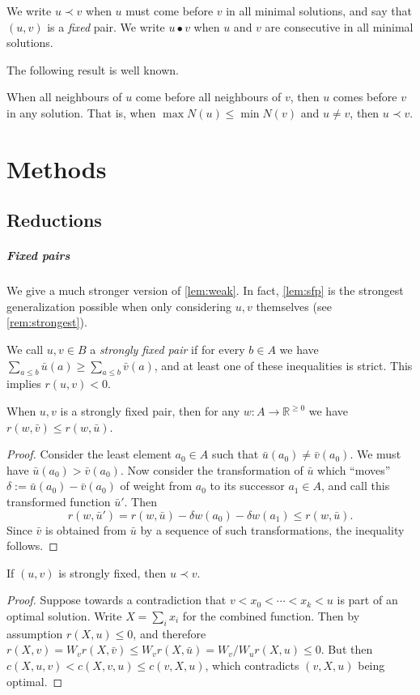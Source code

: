\documentclass[a4paper,UKenglish,cleveref, autoref, thm-restate]{lipics-v2021}
\renewcommand{\b}{\prec}
\newcommand{\g}{\bullet}
\begin{document}
We write $u\b v$ when $u$ must come before $v$ in all minimal solutions, and say that $(u, v)$
is a \emph{fixed} pair.
We write $u\g v$ when $u$ and $v$ are consecutive in all minimal solutions.

The following result is well known.

\begin{observation}\label{lem:weak}
  When all neighbours of $u$ come before all neighbours of $v$, then $u$ comes
  before $v$ in any solution.
  That is, when $\max N(u) \leq \min N(v)$ and $u\neq v$, then $u\b v$.
\end{observation}

\section{Methods}
\subsection{Reductions}
\subparagraph{Fixed pairs}
We give a much stronger version of \cref{lem:weak}. In fact, \cref{lem:sfp} is the strongest
generalization possible when only considering $u, v$ themselves (see \cref{rem:strongest}).
\begin{definition}
    We call $u, v \in B$ a \emph{strongly fixed pair} if for every $b \in A$ we have ${\sum_{a
    \leq b} \bar u(a) \geq \sum_{a \leq b} \bar v(a)}$, and at least one of these inequalities
    is strict. This implies $r(u, v) {<} 0$.
\end{definition}
\begin{lemma}\label{lem:sfp} When $u, v$ is a strongly fixed pair,
    then for any $w: A\to \mathbb R^{\geq 0}$ we have $r(w, \bar v) \leq r(w, \bar u)$.
\end{lemma}
\begin{proof}
    Consider the least element $a_0 \in A$ such that $\bar u(a_0) \neq
    \bar v(a_0)$. We must have $\bar u(a_0) > \bar v(a_0)$. Now consider the transformation of
    $\bar u$ which ``moves'' $\delta := \bar u(a_0) - \bar v(a_0)$ of weight from $a_0$ to its
    successor $a_1 \in A$, and call this transformed function $\bar u'$. Then
    \[
        r(w, \bar u') = r(w, \bar u) - \delta w(a_0) - \delta w(a_1) \leq r(w, \bar u).
    \]
    Since $\bar v$ is obtained from $\bar u$ by a sequence of such transformations,
    the inequality follows.
\end{proof}
\begin{lemma}
    If $(u, v)$ is strongly fixed, then $u \b v$.
\end{lemma}
\begin{proof}
    Suppose towards a contradiction that $v < x_0 < \cdots < x_k < u$ is part of an optimal
    solution. Write $X = \sum_i x_i$ for the combined function. Then by assumption $r(X, u)
    \leq 0$, and therefore $r(X, v) = W_v r(X, \bar v) \leq W_v r(X, \bar u) = W_v / W_u r(X,
    u) \leq 0$. But then $c(X, u, v) < c(X, v, u)\leq c(v, X, u)$, which
    contradicts $(v,X,u)$ being optimal.
\end{proof}
\end{document}
